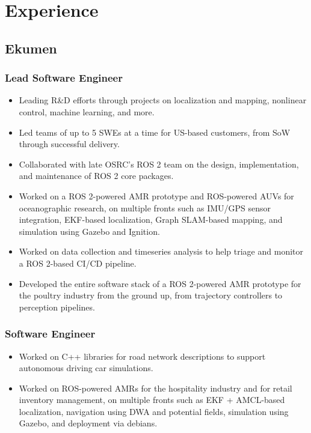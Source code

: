 \documentclass[english, letterpaper]{resume}
\renewcommand{\date}[2]{%
  \DTMenglishshortmonthname{#2} #1}
\begin{document}
\section*{Experience}

\subsection*[\icon{ekumen}]{Ekumen }

\subsubsection*{Lead Software Engineer \thru{\date{2018}{9}}{Present}}
\begin{itemize}
  \item Leading R\&D efforts through projects on localization and mapping, nonlinear control, machine learning, and more.
  \item Led teams of up to 5 SWEs at a time for US-based customers, from SoW through successful delivery.
  \item Collaborated with late OSRC's ROS 2 team on the design, implementation, and maintenance of ROS 2 core packages.
  \item Worked on a ROS 2-powered AMR prototype and ROS-powered AUVs for oceanographic research, on multiple fronts such as IMU/GPS sensor integration, EKF-based localization, Graph SLAM-based mapping, and simulation using Gazebo and Ignition.
  \item Worked on data collection and timeseries analysis to help triage and monitor a ROS 2-based CI/CD pipeline.
  \item Developed the entire software stack of a ROS 2-powered AMR prototype for the poultry industry from the ground up, from trajectory controllers to perception pipelines.
\end{itemize}

\subsubsection*{Software Engineer \thru{\date{2015}{8}}{\date{2018}{9}}}
\begin{itemize}
  \item Worked on C++ libraries for road network descriptions to support autonomous driving car simulations.
  \item Worked on ROS-powered AMRs for the hospitality industry and for retail inventory management, on multiple fronts such as EKF + AMCL-based localization, navigation using DWA and potential fields, simulation using Gazebo, and deployment via debians.
\end{itemize}
\end{document}
